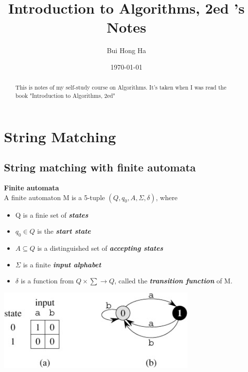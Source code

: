 \documentclass[12pt]{article}
\title{Introduction to Algorithms, 2ed 's Notes}
\author{Bui Hong Ha}
\date{\today}
\begin{document}
\maketitle
\begin{abstract}
This is notes of my self-study course on Algorithms. It's taken when I was read the book "Introduction to Algorithms, 2ed"
\end{abstract}

\tableofcontents

\section{String Matching}
\subsection{String matching with finite automata}
\textbf{Finite automata}\\
A finite automaton M is a 5-tuple $ (Q,q_0, A, \Sigma, \delta) $, where
\begin {itemize}
	\item Q is a finie set of \textbf{\textit{states}}
	\item $ q_0 \in Q $ is the \textbf{\textit{start state}}
	\item $ A \subseteq Q $ is a distinguished set of \textbf{\textit{accepting states}}
	\item $ \Sigma $ is a finite \textbf{\textit{input alphabet}}
	\item $ \delta $ is a function from $ Q \times \sum \rightarrow Q $, called the \textbf{\textit{transition function}} of M.
\end {itemize}  

\includegraphics[width=100mm]{simple_2_states_automaton.jpg} 
\\
\end{document}
